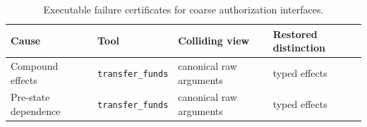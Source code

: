 \begin{table}[t]
\centering
\scriptsize
\caption{Executable failure certificates for coarse authorization interfaces.}
\label{tab:failure-certificates}
\begin{tabular}{llll}
\toprule
Cause & Tool & Colliding view & Restored distinction \\
\midrule
Compound effects & \texttt{transfer_funds} & canonical raw arguments & typed effects \\
Pre-state dependence & \texttt{transfer_funds} & canonical raw arguments & typed effects \\
\bottomrule
\end{tabular}
\end{table}
